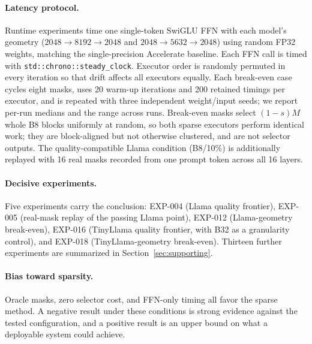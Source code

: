 \paragraph{Latency protocol.} Runtime experiments time one single-token SwiGLU
FFN with each model's geometry ($2048\!\to\!8192\!\to\!2048$ and
$2048\!\to\!5632\!\to\!2048$) using random FP32 weights, matching the
single-precision Accelerate baseline. Each FFN call is timed with
\texttt{std::chrono::steady\_clock}. Executor order is randomly permuted in
every iteration so that drift affects all executors equally. Each break-even
case cycles eight masks, uses 20 warm-up iterations and 200 retained timings
per executor, and is repeated with three independent weight/input seeds; we
report per-run medians and the range across runs. Break-even masks select
$(1-s)M$ whole B8 blocks uniformly at random, so both sparse executors perform
identical work; they are block-aligned but not otherwise clustered, and are
not selector outputs. The quality-compatible Llama condition (B8/10\%) is
additionally replayed with 16 real masks recorded from one prompt token
across all 16 layers.

\paragraph{Decisive experiments.} Five experiments carry the conclusion:
EXP-004 (Llama quality frontier), EXP-005 (real-mask replay of the passing
Llama point), EXP-012 (Llama-geometry break-even), EXP-016 (TinyLlama quality
frontier, with B32 as a granularity control), and EXP-018 (TinyLlama-geometry
break-even). Thirteen further experiments are summarized in
Section~\ref{sec:supporting}.

\paragraph{Bias toward sparsity.} Oracle masks, zero selector cost, and
FFN-only timing all favor the sparse method. A negative result under these
conditions is strong evidence against the tested configuration, and a positive
result is an upper bound on what a deployable system could achieve.
